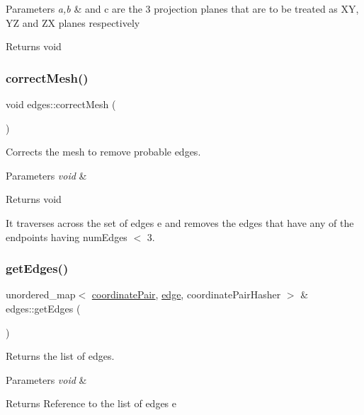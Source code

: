 \begin{DoxyParams}{Parameters}
{\em a,b} & and c are the 3 projection planes that are to be treated as XY, YZ and ZX planes respectively \\
\hline
\end{DoxyParams}
\begin{DoxyReturn}{Returns}
void 
\end{DoxyReturn}
\mbox{\label{classedges_a51fcc59ce1ad81ef7a3dcce1b5a417a0}} 
\subsubsection{\texorpdfstring{correct\+Mesh()}{correctMesh()}}
{\footnotesize\ttfamily void edges\+::correct\+Mesh (\begin{DoxyParamCaption}{ }\end{DoxyParamCaption})}



Corrects the mesh to remove probable edges. 


\begin{DoxyParams}{Parameters}
{\em void} & \\
\hline
\end{DoxyParams}
\begin{DoxyReturn}{Returns}
void
\end{DoxyReturn}
It traverses across the set of edges e and removes the edges that have any of the endpoints having num\+Edges $<$ 3. \mbox{\label{classedges_a5a24034feb3fe92e609d1c572d076e4e}} 
\subsubsection{\texorpdfstring{get\+Edges()}{getEdges()}}
{\footnotesize\ttfamily unordered\+\_\+map$<$ \mbox{\hyperlink{structcoordinate_pair}{coordinate\+Pair}}, \mbox{\hyperlink{structedge}{edge}}, coordinate\+Pair\+Hasher $>$ \& edges\+::get\+Edges (\begin{DoxyParamCaption}{ }\end{DoxyParamCaption})}



Returns the list of edges. 


\begin{DoxyParams}{Parameters}
{\em void} & \\
\hline
\end{DoxyParams}
\begin{DoxyReturn}{Returns}
Reference to the list of edges e 
\end{DoxyReturn}
\mbox{\label{classedges_a512e0c379fed7aae9c92fc059250c25c}} 
